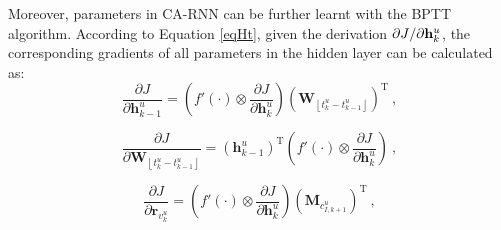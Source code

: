 \documentclass{sig-alternate}
\begin{document}
Moreover, parameters in CA-RNN can be further learnt with the BPTT algorithm. According to Equation \eqref{eqHt}, given the derivation ${\partial J \mathord{\left/ \right. \kern-\nulldelimiterspace} {\partial \mathbf{h}_{k}^{u} } }$, the corresponding gradients of all parameters in the hidden layer can be calculated as: 
\begin{displaymath}
\frac{{\partial J}}{{\partial \mathbf{h}^u_{k-1} }} =  \left( {f'\left(  \cdot  \right) \otimes \frac{{\partial J}}{{\partial \mathbf{h}^u_{k} }}} \right)\left({\mathbf{W}_{\left \lfloor t_{k}^{u} - t_{k-1}^{u} \right \rfloor}}\right)^\mathrm{T} ~,
\end{displaymath}

\begin{displaymath}
\frac{{\partial J}}{{\partial {\mathbf{W}_{\left \lfloor t_{k}^{u} - t_{k-1}^{u} \right \rfloor}} }} =  \left({\mathbf{h}_{k-1}^u}\right)^\mathrm{T}\left( {f'\left(  \cdot  \right) \otimes \frac{{\partial J}}{{\partial \mathbf{h}^u_{k} }}} \right) ~,
\end{displaymath}

\begin{displaymath}
\frac{{\partial J}}{{\partial \mathbf{r}_{v_k^u} }} =  \left( {f'\left(  \cdot  \right) \otimes \frac{{\partial J}}{{\partial \mathbf{h}^u_{k} }}} \right)\left({\mathbf{M}_{c^u_{I,k+1}}}\right)^\mathrm{T} ~,
\end{displaymath}
\end{document}
